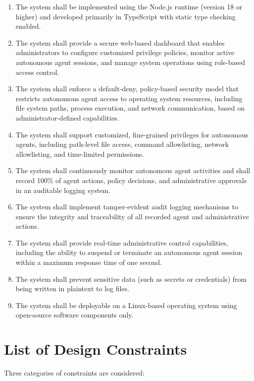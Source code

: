 \documentclass[a4paper]{report}
\begin{document}
\begin{enumerate}
    \item The system shall be implemented using the Node.js runtime (version 18 or higher) and developed primarily in TypeScript with static type checking enabled.
    \item The system shall provide a secure web-based dashboard that enables administrators to configure customized privilege policies, monitor active autonomous agent sessions, and manage system operations using role-based access control.
    \item The system shall enforce a default-deny, policy-based security model that restricts autonomous agent access to operating system resources, including file system paths, process execution, and network communication, based on administrator-defined capabilities.
    \item The system shall support customized, fine-grained privileges for autonomous agents, including path-level file access, command allowlisting, network allowlisting, and time-limited permissions.
    \item The system shall continuously monitor autonomous agent activities and shall record 100\% of agent actions, policy decisions, and administrative approvals in an auditable logging system.
    \item The system shall implement tamper-evident audit logging mechanisms to ensure the integrity and traceability of all recorded agent and administrative actions.
    \item The system shall provide real-time administrative control capabilities, including the ability to suspend or terminate an autonomous agent session within a maximum response time of one second.
    \item The system shall prevent sensitive data (such as secrets or credentials) from being written in plaintext to log files.
    \item The system shall be deployable on a Linux-based operating system using open-source software components only.
\end{enumerate}


\section{List of Design Constraints}
\label{ch:dsn-cs_1}
Three categories of constraints are considered:
\end{document}
